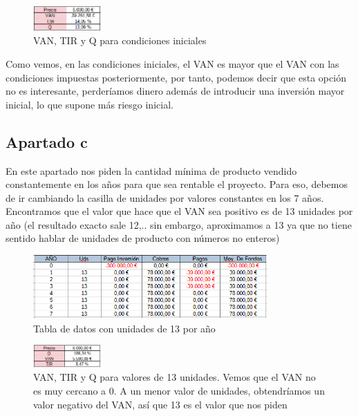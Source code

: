 \documentclass[11pt,letterpaper,onecolumn]{article}
\begin{document}
\begin{figure}[H]
	\centering
	\includegraphics[width=0.23\textwidth]{imagen/ej2b_or_VAN.PNG}
	\caption{VAN, TIR y Q para condiciones iniciales}
	\label{fig:imagen-ej2b_or_VAN-PNG}
\end{figure}
Como vemos, en las condiciones iniciales, el VAN es mayor que el VAN con las condiciones impuestas posteriormente, por tanto, podemos decir que esta opción no es interesante, perderíamos dinero además de introducir una inversión mayor inicial, lo que supone más riesgo inicial.
\subsection{Apartado c}
En este apartado nos piden la cantidad mínima de producto vendido constantemente en los años para que sea rentable el proyecto. Para eso, debemos de ir cambiando la casilla de unidades por valores constantes en los 7 años. Encontramos que el valor que hace que el VAN sea positivo es de 13 unidades por año (el resultado exacto sale 12,.. sin embargo, aproximamos a 13 ya que no tiene sentido hablar de unidades de producto con números no enteros)
\begin{figure}[H]
	\centering
	\includegraphics[width=0.8\textwidth]{imagen/ej2c.PNG}
	\caption{Tabla de datos con unidades de 13 por año}
	\label{fig:ej2c-PNG}
\end{figure}
\begin{figure}[H]
	\centering
	\includegraphics[width=0.23\textwidth]{imagen/ej2c_van.png}
	\caption{VAN, TIR y Q para valores de 13 unidades. Vemos que el VAN no es muy cercano a 0. A un menor valor de unidades, obtendríamos un valor negativo del VAN, así que 13 es el valor que nos piden}
\end{figure}
\end{document}
